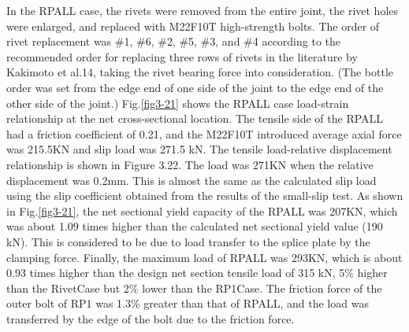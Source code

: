 In the RPALL case, the rivets were removed from the entire joint, the rivet holes were enlarged, and replaced with M22F10T high-strength bolts. The order of rivet replacement was \#1, \#6, \#2, \#5, \#3, and \#4 according to the recommended order for replacing three rows of rivets in the literature by Kakimoto et al.14, taking the rivet bearing force into consideration. (The bottle order was set from the edge end of one side of the joint to the edge end of the other side of the joint.)
Fig.\ref{fig3-21} shows the RPALL case load-strain relationship at the net cross-sectional location. The tensile side of the RPALL had a friction coefficient of 0.21, and the M22F10T introduced average axial force was 215.5KN and slip load was 271.5 kN.
The tensile load-relative displacement relationship is shown in Figure 3.22. The load was 271KN when the relative displacement was 0.2mm. This is almost the same as the calculated slip load using the slip coefficient obtained from the results of the small-slip test.
As shown in Fig.\ref{fig3-21}, the net sectional yield capacity of the RPALL was 207KN, which was about 1.09 times higher than the calculated net sectional yield value (190 kN). This is considered to be due to load transfer to the splice plate by the clamping force. Finally, the maximum load of RPALL was 293KN, which is about 0.93 times higher than the design net section tensile load of 315 kN, 5\% higher than the RivetCase but 2\% lower than the RP1Case. The friction force of the outer bolt of RP1 was 1.3\% greater than that of RPALL, and the load was transferred by the edge of the bolt due to the friction force.

